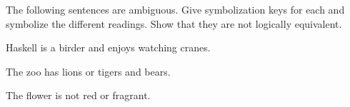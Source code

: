 





\begin{practiceproblems}
	\solutions
	\problempart The following sentences are ambiguous. Give symbolization keys for each and symbolize the different readings. Show that they are not logically equivalent. 
	\begin{problemslist}
		\item Haskell is a birder and enjoys watching cranes.
		\item The zoo has lions or tigers and bears.
		\item The flower is not red or fragrant.
	\end{problemslist}
\end{practiceproblems}
